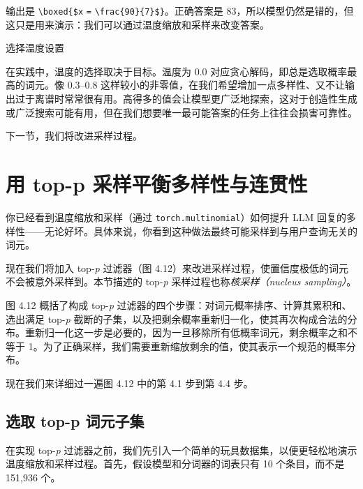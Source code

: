 输出是 \texttt{\textbackslash boxed\{\$x} \texttt{=} \texttt{\textbackslash frac\{90\}\{7\}\$\}}。正确答案是 83，所以模型仍然是错的，但这只是用来演示：我们可以通过温度缩放和采样来改变答案。

\begin{mySidebar}{选择温度设置}

在实践中，温度的选择取决于目标。温度为 0.0 对应贪心解码，即总是选取概率最高的词元。像 0.3–0.8 这样较小的非零值，在我们希望增加一点多样性、又不让输出过于离谱时常常很有用。高得多的值会让模型更广泛地探索，这对于创造性生成或广泛搜索可能有用，但在我们想要唯一最可能答案的任务上往往会损害可靠性。

\end{mySidebar}

下一节，我们将改进采样过程。

\section{用 top-p 采样平衡多样性与连贯性}

你已经看到温度缩放和采样（通过 \texttt{torch.multinomial}）如何提升 LLM 回复的多样性——无论好坏。具体来说，你看到这种做法最终可能采样到与用户查询无关的词元。

现在我们将加入 top-\emph{p} 过滤器（图 4.12）来改进采样过程，使置信度极低的词元不会被意外采样到。本节描述的 top-\emph{p} 采样过程也称\emph{核采样（nucleus sampling）}。


图 4.12 概括了构成 top-\emph{p} 过滤器的四个步骤：对词元概率排序、计算其累积和、选出满足 top-\emph{p} 截断的子集，以及把剩余概率重新归一化，使其再次构成合法的分布。重新归一化这一步是必要的，因为一旦移除所有低概率词元，剩余概率之和不等于 1。为了正确采样，我们需要重新缩放剩余的值，使其表示一个规范的概率分布。

现在我们来详细过一遍图 4.12 中的第 4.1 步到第 4.4 步。

\subsection{选取 top-p 词元子集}

在实现 top-\emph{p} 过滤器之前，我们先引入一个简单的玩具数据集，以便更轻松地演示温度缩放和采样过程。首先，假设模型和分词器的词表只有 10 个条目，而不是 151,936 个。

